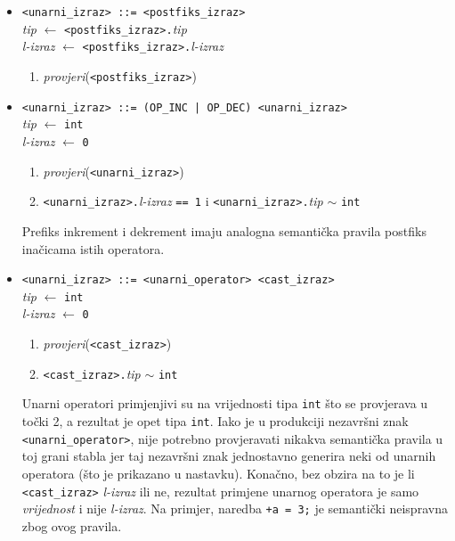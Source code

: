 \documentclass[times, 12pt, utf8]{book}
\begin{document}
\begin{itemize}

\item
\verb|<unarni_izraz> ::= <postfiks_izraz>|\\
\emph{tip} \(\leftarrow\) \verb|<postfiks_izraz>.|\emph{tip}\\
\emph{l-izraz} \(\leftarrow\) \verb|<postfiks_izraz>.|\emph{l-izraz}
\begin{enumerate}
\item
\emph{provjeri}(\verb|<postfiks_izraz>|)
\end{enumerate}

\item
\verb#<unarni_izraz> ::= (OP_INC | OP_DEC) <unarni_izraz>#\\
\emph{tip} \(\leftarrow\) \verb|int|\\
\emph{l-izraz} \(\leftarrow\) \verb|0|
\begin{enumerate}
\item
\emph{provjeri}(\verb|<unarni_izraz>|)
\item
\verb|<unarni_izraz>.|\emph{l-izraz} \verb|== 1| i \verb|<unarni_izraz>.|\emph{tip} \(\sim\) \verb|int|
\end{enumerate}

Prefiks inkrement i dekrement imaju analogna semantička pravila postfiks inačicama istih operatora.

\item
\verb|<unarni_izraz> ::= <unarni_operator> <cast_izraz>|\\
\emph{tip} \(\leftarrow\) \verb|int|\\
\emph{l-izraz} \(\leftarrow\) \verb|0|
\begin{enumerate}
\item
\emph{provjeri}(\verb|<cast_izraz>|)
\item
\verb|<cast_izraz>.|\emph{tip} \(\sim\) \verb|int|
\end{enumerate}

Unarni operatori primjenjivi su na vrijednosti tipa \verb|int| što se provjerava u točki 2, a rezultat je opet tipa \verb|int|.
Iako je u produkciji nezavršni znak \verb|<unarni_operator>|, nije potrebno provjeravati nikakva semantička pravila u toj grani stabla jer taj nezavršni znak jednostavno generira neki od unarnih operatora (što je prikazano u nastavku).
Konačno, bez obzira na to je li \verb|<cast_izraz>| \emph{l-izraz} ili ne, rezultat primjene unarnog operatora je samo \emph{vrijednost} i nije \emph{l-izraz}.
Na primjer, naredba \verb|+a = 3;| je semantički neispravna zbog ovog pravila.

\end{itemize}
\end{document}
